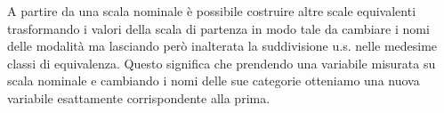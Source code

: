 A partire da una scala nominale è possibile costruire altre scale equivalenti trasformando i valori della scala di partenza in modo tale da cambiare i nomi delle modalità ma lasciando però inalterata la suddivisione u.s. nelle medesime classi di equivalenza. Questo significa che prendendo una variabile misurata su scala nominale e cambiando i nomi delle sue categorie otteniamo una nuova variabile esattamente corrispondente alla prima. 

%
